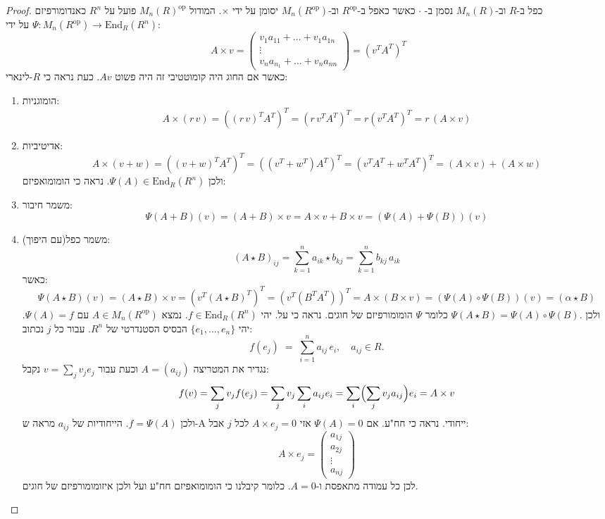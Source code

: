 \documentclass{tstextbook}
\begin{document}
\begin{proof}
כפל ב-\(R\) וב-\(M_{n}(R)\) נסמן ב- \(\cdot\) כאשר כאפל ב-\(R^{\text{op}}\) וב-\(M_{n}(R^{\text{op}})\) יסומן על ידי \(\times\).
המודול \(M_{n}(R)^{\text{op}}\) פועל על \(R^{n}\) כאנדומורפיזם \(\Psi:M_{n}(R^{\text{op}})\to \mathrm{End}_{R}(R^{n})\) על ידי: 
$$A\times v = \begin{pmatrix}v_{1}a_{11}+\dots+v_{1}a_{1n} \\\vdots \\v_{n}a_{n_{1}}+\dots+v_{n}a_{nn}
\end{pmatrix}=(v^{T}A^{T})^{T}$$
כאשר אם החוג היה קומוטטיבי זה היה פשוט \(Av\). כעת נראה כי \(R\)-לינארי:

  \begin{enumerate}
    \item הומוגניות: 
$$A\times(r\,v)=\left((r\,v)^{T}A^{T}\right)^{T}=\left(r\,v^{T}A^{T}\right)^{T}=r\left(v^{T}A^{T}\right)^{T}=r\,(A\times v)$$


    \item אדיטיביות: 
$$A\times(v+w)=\left((v+w)^{T}A^{T}\right)^{T}=\left((v^{T}+w^{T})A^{T}\right)^{T}=\left(v^{T}A^{T}+w^{T}A^{T}\right)^{T}=(A\times v)+(A\times w)$$
ולכן \(\Psi(A)\in \mathrm{End}_{R}(R^{n})\). נראה כי הומומואפיזם:


    \item משמר חיבור: 
$$\Psi(A+B)(v)=(A+B)\times v=A\times v+B\times v=(\Psi(A)+\Psi(B))(v)$$


    \item משמר כפל(עם היפוך): 
$$(A\star B)_{i j}=\sum_{k=1}^{n}a_{i k}\star b_{k j}=\sum_{k=1}^{n}b_{k j}\,a_{i k}$$
כאשר:
$$\Psi(A\star B)(v)=(A\star B)\times v=\left(v^{T}(A\star B)^{T}\right)^{T}=\left(v^{T}(B^{T}A^{T})\right)^{T}=A\times(B\times v)=(\Psi(A)\circ\Psi(B))(v)=(\alpha\star B)$$
ולכן \(\Psi(A\star B)=\Psi(A)\circ\Psi(B).\) כלומר \(\Psi\) הומומורפיזם של חוגים. נראה כי על. יהי \(f\in \mathrm{End}_{R}(R^{n})\). נמצא \(A \in M_{n}(R^{\text{op}})\) עם \(\Psi(A)=f\). יהי \(\{ e_{1},\dots,e_{n}  \}\) הבסיס הסטנדרטי של \(R^{n}\). עבור כל \(j\) נכתוב:
$$f(e_{j})\;=\;\sum_{i=1}^{n}a_{i j}\,e_{i},\quad a_{i j}\in R.$$
נגדיר את המטריצה \(A=(a_{ij})\) וכעת עבור \(v=\sum_{j}v_{j}e_{j}\) נקבל:
$$f(v)=\sum_{j}v_{j}f(e_{j})=\sum_{j}v_{j}\sum_{i}a_{i j}e_{i}=\sum_{i}\Bigl(\sum_{j}v_{j}a_{i j}\Bigr)e_{i}=A\times v$$
ולכן \(f=\Psi(A)\). הייחודיות של \(a_{ij}\) מראה ש-A ייחודי. נראה כי חח"ע. אם \(\Psi(A)=0\) אזי \(A\times e_{j}=0\) לכל \(j\) אבל:
$$A\times e_{j}=\begin{pmatrix}a_{1j}\\ a_{2j}\\ \vdots\\a_{nj}
\end{pmatrix}$$
לכן כל עמודה מתאפסת ו-\(A=0\). כלומר קיבלנו כי הומומואפיזם חח"ע ועל ולכן איזומומורפיזם של חוגים.


  \end{enumerate}
\end{proof}
\end{document}
